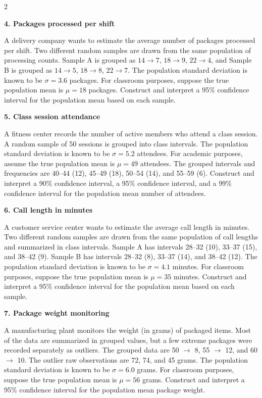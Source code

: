 \documentclass[12pt]{article}
\newcommand{\SubsectionBox}[1]{%
	\noindent\colorbox{gray!30}{%
		\parbox{\linewidth}{\textbf{#1}}%
	}\par\vspace{0.35cm}%
}
\begin{document}
\begin{multicols}{2}
		\vspace{0.25cm}
		\SubsectionBox{4. Packages processed per shift}\vspace{-0.25cm}
		A delivery company wants to estimate the average number of packages processed per shift.
		Two different random samples are drawn from the same population of processing counts.
		Sample A is grouped as \(14 \rightarrow 7\), \(18 \rightarrow 9\), \(22 \rightarrow 4\), and Sample B is grouped as \(14 \rightarrow 5\), \(18 \rightarrow 8\), \(22 \rightarrow 7\).
		The population standard deviation is known to be \(\sigma = 3.6\) packages.
		For classroom purposes, suppose the true population mean is \(\mu = 18\) packages.
		Construct and interpret a 95\% confidence interval for the population mean based on each sample.

		\vspace{0.25cm}
		\SubsectionBox{5. Class session attendance}\vspace{-0.25cm}
		A fitness center records the number of active members who attend a class session.
		A random sample of 50 sessions is grouped into class intervals. The population standard deviation is known to be \(\sigma = 5.2\) attendees.
		For academic purposes, assume the true population mean is \(\mu = 49\) attendees.
		The grouped intervals and frequencies are 40--44 (12), 45--49 (18), 50--54 (14), and 55--59 (6).
		Construct and interpret a 90\% confidence interval, a 95\% confidence interval, and a 99\% confidence interval for the population mean number of attendees.

		\vspace{0.25cm}
		\SubsectionBox{6. Call length in minutes}\vspace{-0.25cm}
		A customer service center wants to estimate the average call length in minutes.
		Two different random samples are drawn from the same population of call lengths and summarized in class intervals.
		Sample A has intervals 28--32 (10), 33--37 (15), and 38--42 (9).
		Sample B has intervals 28--32 (8), 33--37 (14), and 38--42 (12).
		The population standard deviation is known to be \(\sigma = 4.1\) minutes.
		For classroom purposes, suppose the true population mean is \(\mu = 35\) minutes.
		Construct and interpret a 95\% confidence interval for the population mean based on each sample.

		\vspace{0.25cm}
		\SubsectionBox{7. Package weight monitoring}\vspace{-0.25cm}
		A manufacturing plant monitors the weight (in grams) of packaged items.
		Most of the data are summarized in grouped values, but a few extreme packages were recorded separately as outliers.
		The grouped data are 50 $\rightarrow$ 8, 55 $\rightarrow$ 12, and 60 $\rightarrow$ 10.
		The outlier raw observations are 72, 74, and 45 grams.
		The population standard deviation is known to be \(\sigma = 6.0\) grams.
		For classroom purposes, suppose the true population mean is \(\mu = 56\) grams.
		Construct and interpret a 95\% confidence interval for the population mean package weight.

	\end{multicols}
\end{document}
